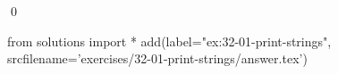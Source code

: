 
\begin{ex}
  \label{ex:32-01-print-strings}
  
  \qed
\end{ex}
\begin{python0}
from solutions import *
add(label="ex:32-01-print-strings",
    srcfilename='exercises/32-01-print-strings/answer.tex')
\end{python0}
